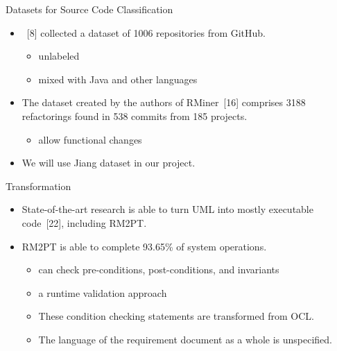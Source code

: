 \documentclass[xcolor=svgnames]{beamer}
\begin{document}
\begin{frame}{Datasets for Source Code Classification}
\begin{itemize}
\item {}~[8] collected a dataset of \num{1006} repositories from GitHub.
\begin{itemize}
\item unlabeled
\item mixed with Java and other languages
\end{itemize}

\item The dataset created by the authors of RMiner~[16] comprises \num{3188} refactorings found in 538 commits from 185 projects.
\begin{itemize}
\item allow functional changes
\end{itemize}

\item We will use Jiang dataset in our project.
\end{itemize}

\end{frame}


\begin{frame}{Transformation}

\begin{itemize}
\item State-of-the-art research is able to turn UML into mostly executable code~[22], including RM2PT.
\item RM2PT is able to complete 93.65\% of system operations.
\begin{itemize}
\item can check pre-conditions, post-conditions, and invariants
\item a runtime validation approach
\item<2-> These condition checking statements are transformed from OCL.
\item<3-> The language of the requirement document as a whole is unspecified.
\end{itemize}

\end{itemize}

\end{frame}
\end{document}
